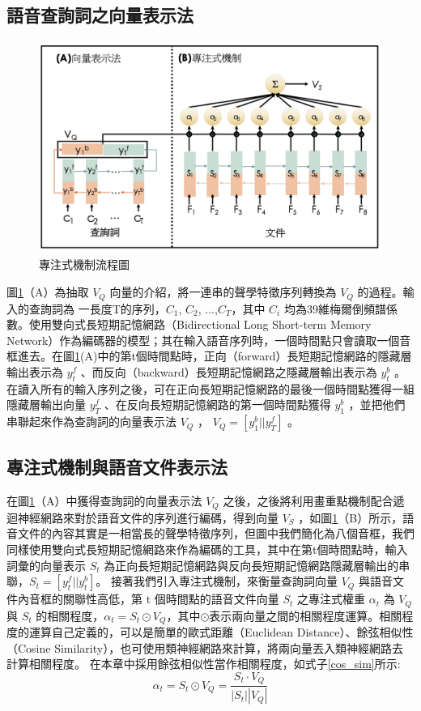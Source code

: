 \subsection{語音查詢詞之向量表示法}
\label{ch4_qv}
\begin{figure}[h]
\centering
\includegraphics[scale=0.7]{images/ch4_att.png} 
\caption{專注式機制流程圖}
\label{ch4_att}
\end{figure}
\label{ch4_query_vec}
圖\ref{ch4_att}（A）為抽取 $V_Q$ 向量的介紹，將一連串的聲學特徵序列轉換為
$V_Q$ 的過程。輸入的查詢詞為
一長度T的序列，$C_1$, $C_2$,
...,$C_T$，其中 $C_i$ 均為39維梅爾倒頻譜係數。使用雙向式長短期記憶網路（Bidirectional
Long Short-term Memory
Network）作為編碼器的模型；其在輸入語音序列時，一個時間點只會讀取一個音框進去。在圖\ref{ch4_att}(A)中的第t個時間點時，正向（forward）長短期記憶網路的隱藏層輸出表示為
$y_t^f$ 、而反向（backward）長短期記憶網路之隱藏層輸出表示為 $y_{t}^b$
。在讀入所有的輸入序列之後，可在正向長短期記憶網路的最後一個時間點獲得一組隱藏層輸出向量
$y_{T}^f$ 、在反向長短期記憶網路的第一個時間點獲得 $y_{1}^b$
，並把他們串聯起來作為查詢詞的向量表示法 $V_Q$ ， $V_Q
= [y_1^b || y_T^f]$ 。

\subsection{專注式機制與語音文件表示法}
在圖\ref{ch4_att}（A）中獲得查詢詞的向量表示法 $V_Q$
之後，之後將利用畫重點機制配合遞迴神經網路來對於語音文件的序列進行編碼，得到向量
$V_S$
，如圖\ref{ch4_att}（B）所示，語音文件的內容其實是一相當長的聲學特徵序列，但圖中我們簡化為八個音框，我們同樣使用雙向式長短期記憶網路來作為編碼的工具，其中在第t個時間點時，輸入詞彙的向量表示
$S_t$ 為正向長短期記憶網路與反向長短期記憶網路隱藏層輸出的串聯，$S_t
= [ y_t^f || y_t^b ]$。
接著我們引入專注式機制，來衡量查詢詞向量 $V_Q$
與語音文件內音框的關聯性高低，第 t 個時間點的語音文件向量 $S_t$
之專注式權重 $\alpha_t$ 為 $V_Q$ 與 $S_t$ 的相關程度，$\alpha_t=
S_t \odot
V_Q$，其中$\odot$表示兩向量之間的相關程度運算。相關程度的運算自己定義的，可以是簡單的歐式距離（Euclidean
Distance）、餘弦相似性（Cosine Similarity），也可使用類神經網路來計算，將兩向量丟入類神經網路去計算相關程度。
在本章中採用餘弦相似性當作相關程度，如式子\ref{cos_sim}所示:
\begin{equation}
	\label{cos_sim}
	\alpha_t = S_t \odot V_Q = \frac{S_t \cdot V_Q}{|S_t||V_Q|}
\end{equation}

